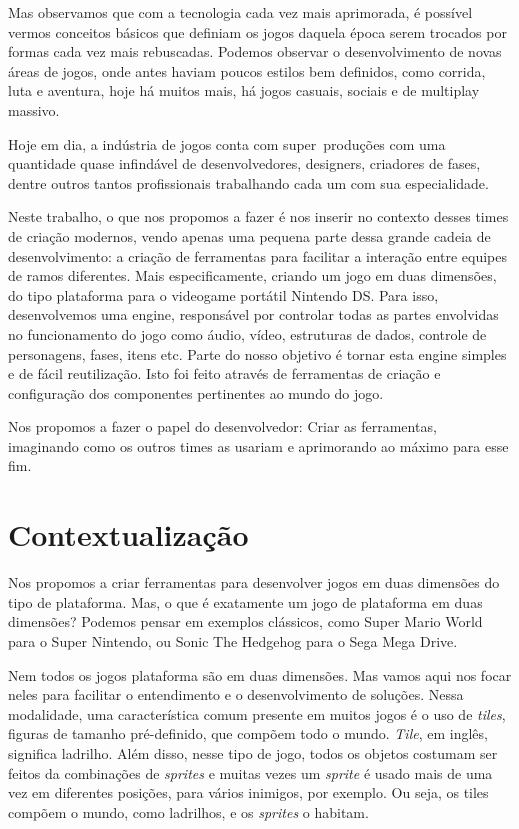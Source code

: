\documentclass[brazil]{abnt}
\begin{document}
Mas observamos que com a tecnologia cada vez mais aprimorada, é possível vermos conceitos básicos que definiam os jogos daquela época serem trocados por formas cada vez mais rebuscadas. Podemos observar o desenvolvimento de novas áreas de jogos, onde antes haviam poucos estilos bem definidos, como corrida, luta e aventura, hoje há muitos mais, há jogos casuais, sociais e de multiplay massivo.

Hoje em dia, a indústria de jogos conta com super~produções com uma quantidade quase infindável de desenvolvedores, designers, criadores de fases, dentre outros tantos profissionais trabalhando cada um com sua especialidade.

Neste trabalho, o que nos propomos a fazer é nos inserir no contexto desses times de criação modernos, vendo apenas uma pequena parte dessa grande cadeia de desenvolvimento: a criação de ferramentas para facilitar a interação entre equipes de ramos diferentes. Mais especificamente, criando um jogo em duas dimensões, do tipo plataforma para o videogame portátil Nintendo DS. Para isso, desenvolvemos uma engine, responsável por controlar todas as partes envolvidas no funcionamento do jogo como áudio, vídeo, estruturas de dados, controle de personagens, fases, itens etc. Parte do nosso objetivo é tornar esta engine  simples e de fácil reutilização. Isto foi feito através de ferramentas de criação e configuração dos componentes pertinentes ao mundo do jogo.

Nos propomos a fazer o papel do desenvolvedor: Criar as ferramentas, imaginando como os outros times as usariam e aprimorando ao máximo para esse fim.

\section{Contextualização}

Nos propomos a criar ferramentas para desenvolver jogos em duas dimensões do tipo de plataforma. Mas, o que é exatamente um jogo de plataforma em duas dimensões? Podemos pensar em exemplos clássicos, como Super Mario World para o Super Nintendo, ou Sonic The Hedgehog para o Sega Mega Drive.

Nem todos os jogos plataforma são em duas dimensões. Mas vamos aqui nos focar neles para facilitar o entendimento e o desenvolvimento de soluções. Nessa modalidade, uma característica comum presente em muitos jogos é o uso de \textit{tiles}, figuras de tamanho pré-definido, que compõem todo o mundo. \textit{Tile}, em inglês, significa ladrilho. Além disso, nesse tipo de jogo, todos os objetos costumam ser feitos da combinações de \textit{sprites} e muitas vezes um \textit{sprite} é usado mais de uma vez em diferentes posições, para vários inimigos, por exemplo. Ou seja, os tiles compõem o mundo, como ladrilhos, e os \textit{sprites} o habitam.
\end{document}
